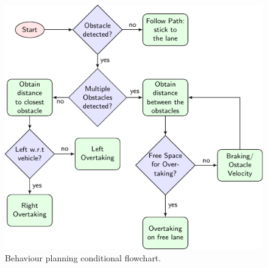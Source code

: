\begin{figure}[!h]
	\centering
	\includegraphics[width=\textwidth]{../figure/flowchart/flowchart.pdf}
	\caption{Behaviour planning conditional flowchart.}
	\label{fig:flowchart}
\end{figure}


